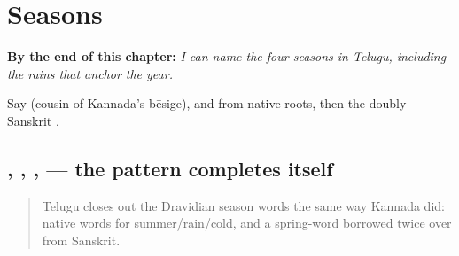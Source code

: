 
\chapter{Seasons}
\label{ch:te-seasons}

\begin{chapteropening}
\textbf{By the end of this chapter:} \emph{I can name the four seasons in Telugu, including the rains that anchor the year.}

Say  (cousin of Kannada's bēsige),  and  from native roots, then the doubly-Sanskrit  .
\end{chapteropening}

\section[\texorpdfstring{\te{వసంత} \te{ఋతువు} \te{వేసవి} … (vasanta ṛtuvu …)}{వసంత ఋతువు వేసవి … (vasanta ṛtuvu …)}]{ , , ,  — the pattern completes itself}

\label{lesson:TE-C14-rutuvulu}



\begin{quote}
Telugu closes out the Dravidian season words the same way Kannada did: native words for summer/rain/cold, and a spring-word borrowed twice over from Sanskrit.
\end{quote}

